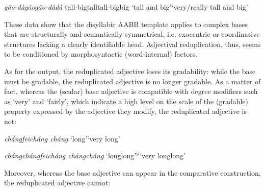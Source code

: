 \documentclass[output=paper]{langsci/langscibook}
\begin{document}
    \ex\label{ex:BascianoMelloni:14c}%
           {\emph{gāo-dà}}{\emph{gāo\tld{}gāo-dà\tld{}dà}}%
           {tall-big}{tall\tld{}tall-big\tld{}big}%
           {`tall and big'}{`very/really tall and big'}

\z
\z

These data show that the disyllabic AABB template applies to complex
bases that are structurally and semantically symmetrical, i.e.
exocentric or coordinative structures lacking a clearly identifiable
head. Adjectival reduplication, thus, seems to be conditioned by
morphosyntactic (word-internal) factors.

As for the output, the reduplicated adjective loses its gradability:
while the base must be gradable, the reduplicated adjective is no longer
gradable. As a matter of fact, whereas the (scalar) base adjective is
compatible with degree modifiers such as `very' and `fairly', which
indicate a high level on the scale of the (gradable) property expressed
by the adjective they modify, the reduplicated adjective is not:


%
% 
\ea\label{ex:BascianoMelloni:15}

    \ea\label{ex:BascianoMelloni:15a}%
            {\emph{cháng}}{\emph{fēicháng cháng}}%
            {`long'}{`very long'}%
 
    \ex\label{ex:BascianoMelloni:15b}%
            {\emph{cháng\tld{}cháng}}{\emph{fēicháng cháng\tld{}cháng}}%
            {`long\tld{}long'}{*`very long\tld{}long'}%
\z\z

Moreover, whereas the base adjective can appear in the comparative
construction, the reduplicated adjective cannot:

\ea\label{ex:BascianoMelloni:16}
\end{document}
